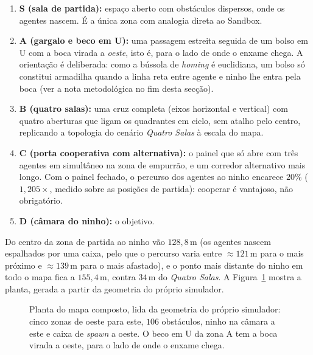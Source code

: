 \begin{enumerate}
    \item \textbf{S (sala de partida):} espaço aberto com obstáculos dispersos,
          onde os agentes nascem. É a única zona com analogia direta ao Sandbox.
    \item \textbf{A (gargalo e beco em U):} uma passagem estreita seguida de um
          bolso em U com a boca virada a \emph{oeste}, isto é, para o lado de
          onde o enxame chega. A orientação é deliberada: como a bússola de
          \textit{homing} é euclidiana, um bolso só constitui armadilha quando a
          linha reta entre agente e ninho lhe entra pela boca (ver a nota
          metodológica no fim desta secção).
    \item \textbf{B (quatro salas):} uma cruz completa (eixos horizontal e
          vertical) com quatro aberturas que ligam os quadrantes em ciclo, sem
          atalho pelo centro, replicando a topologia do cenário
          \textit{Quatro Salas} à escala do mapa.
    \item \textbf{C (porta cooperativa com alternativa):} o painel que só abre
          com três agentes em simultâneo na zona de empurrão, e um corredor
          alternativo mais longo. Com o painel fechado, o percurso dos agentes ao
          ninho encarece $20\%$ ($1{,}205\times$, medido sobre as posições de
          partida): cooperar é vantajoso, não obrigatório.
    \item \textbf{D (câmara do ninho):} o objetivo.
\end{enumerate}

Do centro da zona de partida ao ninho vão $128{,}8$\,m (os agentes nascem
espalhados por uma caixa, pelo que o percurso varia entre $\approx 121$\,m para o
mais próximo e $\approx 139$\,m para o mais afastado), e o ponto mais distante
do ninho em todo o mapa fica a $155{,}4$\,m, contra $34$\,m do
\textit{Quatro Salas}. A
Figura~\ref{fig:mapa_grande_planta} mostra a planta, gerada a partir da
geometria do próprio simulador.

\begin{figure}[H]
    \centering
    \caption[Planta do mapa composto]{Planta do mapa composto, lida da geometria do próprio simulador:
      cinco zonas de oeste para este, $106$ obstáculos, ninho na câmara a este e
      caixa de \textit{spawn} a oeste. O beco em U da zona A tem a boca virada a
      oeste, para o lado de onde o enxame chega.}
    \label{fig:mapa_grande_planta}
\end{figure}

